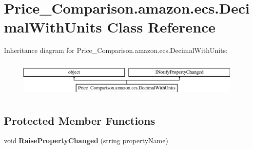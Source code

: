 \hypertarget{class_price___comparison_1_1amazon_1_1ecs_1_1_decimal_with_units}{\section{Price\-\_\-\-Comparison.\-amazon.\-ecs.\-Decimal\-With\-Units Class Reference}
\label{class_price___comparison_1_1amazon_1_1ecs_1_1_decimal_with_units}
}


 


Inheritance diagram for Price\-\_\-\-Comparison.\-amazon.\-ecs.\-Decimal\-With\-Units\-:\begin{figure}[H]
\begin{center}
\leavevmode
\includegraphics[height=1.898305cm]{class_price___comparison_1_1amazon_1_1ecs_1_1_decimal_with_units}
\end{center}
\end{figure}
\subsection*{Protected Member Functions}
\begin{DoxyCompactItemize}
\item 
\hypertarget{class_price___comparison_1_1amazon_1_1ecs_1_1_decimal_with_units_ac1bd89c87843e346e8b4f618bf0112d4}{void {\bfseries Raise\-Property\-Changed} (string property\-Name)}\label{class_price___comparison_1_1amazon_1_1ecs_1_1_decimal_with_units_ac1bd89c87843e346e8b4f618bf0112d4}

\end{DoxyCompactItemize}

